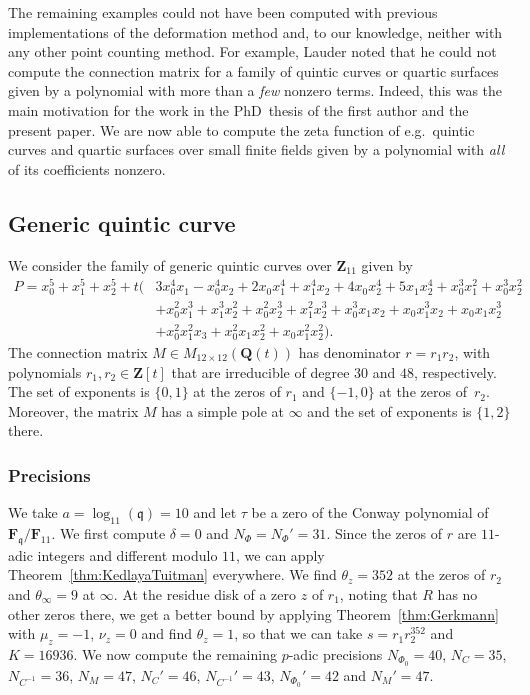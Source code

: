 \documentclass[a4paper,11pt]{article}
\numberwithin{equation}{section}
\newcommand{\ZZ}{\mathbf{Z}} %
\newcommand{\QQ}{\mathbf{Q}} %
\newcommand{\FF}{\mathbf{F}} %
\theoremstyle{definition}
\begin{document}
The remaining examples could not have been computed with previous implementations 
of the deformation method and, to our knowledge, neither with any other point counting 
method.  For example, Lauder noted that he could not compute the connection matrix 
for a family of quintic curves or quartic surfaces given by a polynomial with more 
than a \emph{few} nonzero terms.  Indeed, this was the main motivation for the work 
in the PhD~thesis of the first author and the present paper.  We are now able to 
compute the zeta function of e.g.\ quintic curves and quartic surfaces over small 
finite fields given by a polynomial with \emph{all} of its coefficients nonzero.

\subsection{Generic quintic curve}

We consider the family of generic quintic curves over $\ZZ_{11}$ given by 
\begin{equation*}
\begin{split}
P=x_0^5 + x_1^5 + x_2^5
+ t \bigl( & 3x_0^4 x_1-x_0^4 x_2+2 x_0 x_1^4+x_1^4 x_2+4 x_0 x_2^4+5 x_1 x_2^4 + x_0^3 x_1^2+x_0^3 x_2^2 \\ 
           & + x_0^2 x_1^3+ x_1^3 x_2^2+x_0^2 x_2^3+x_1^2 x_2^3 + x_0^3 x_1 x_2 + x_0 x_1^3 x_2 + x_0 x_1 x_2^3 \\ 
           & + x_0^2 x_1^2 x_3 + x_0^2 x_1 x_2^2 + x_0 x_1^2 x_2^2 \bigr).
\end{split}
\end{equation*}
The connection matrix $M \in M_{12 \times 12}(\QQ(t))$ has denominator 
$r = r_1 r_2$, with polynomials $r_1,r_2 \in \ZZ[t]$ that are irreducible 
of degree $30$ and $48$, respectively. The set of exponents is $\{ 0,1 \}$ 
at the zeros of $r_1$ and $\{ -1,0 \}$ at the zeros of~$r_2$. Moreover, 
the matrix $M$ has a simple pole at $\infty$ and the set of exponents 
is $\{1,2\}$ there.

\subsubsection{Precisions}

We take $a=\log_{11}(\mathfrak{q})=10$ and let $\tau$ be a zero of the Conway polynomial of 
$\FF_{\mathfrak{q}}/\FF_{11}$. We first compute $\delta=0$ and $N_{\Phi}=N_{\Phi}'=31$.
Since the zeros of $r$ are $11$-adic integers and different modulo $11$, we can apply 
Theorem~\ref{thm:KedlayaTuitman} everywhere. We find $\theta_z=352$ at the zeros of $r_2$
and $\theta_{\infty}=9$ at $\infty$. At the residue disk of a zero $z$ of $r_1$, noting that 
$R$ has no other zeros there, we get a better bound by applying 
Theorem~\ref{thm:Gerkmann} with $\mu_z=-1$, $\nu_z=0$ and find $\theta_z=1$, so that we can 
take $s=r_1 r_2^{352}$ and $K=16936$. We now compute the remaining $p$-adic precisions 
$N_{\Phi_0}=40$, $N_C=35$, $N_{C^{-1}}=36$, $N_M=47$, $N_C'=46$, $N_{C^{-1}}'=43$, 
$N_{\Phi_0}'=42$ and $N_M'=47$.
\end{document}

